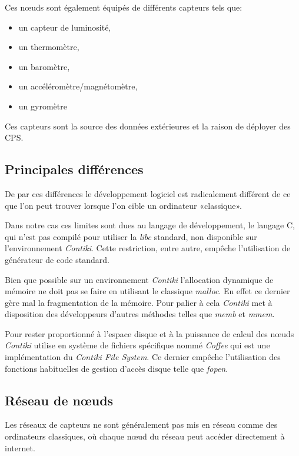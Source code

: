 Ces nœuds sont également équipés de différents capteurs tels que:
\begin{itemize}
\item un capteur de luminosité,
\item un thermomètre,
\item un baromètre,
\item un accéléromètre/magnétomètre,
\item un gyromètre
\end{itemize}

Ces capteurs sont la source des données extérieures et la raison de déployer des CPS.

\subsection{Principales différences}

De par ces différences le développement logiciel est radicalement différent de ce que l'on peut trouver lorsque l'on cible un ordinateur «classique».

Dans notre cas ces limites sont dues au langage de développement, le langage C, qui n'est pas compilé pour utiliser la \emph{libc} standard, non disponible sur l'environnement \emph{Contiki}. Cette restriction, entre autre, empêche l'utilisation de générateur de code standard.

Bien que possible sur un environnement \emph{Contiki} l'allocation dynamique de mémoire ne doit pas se faire en utilisant le classique \emph{malloc}. En effet ce dernier gère mal la fragmentation de la mémoire. Pour palier à cela \emph{Contiki} met à disposition des développeurs d'autres méthodes telles que \emph{memb} et \emph{mmem}\cite{contiki-ma}.

Pour rester proportionné à l'espace disque et à la puissance de calcul des nœuds \emph{Contiki} utilise en système de fichiers spécifique nommé \emph{Coffee} qui est une  implémentation du \emph{Contiki File System}\cite{contiki-fs}. Ce dernier empêche l'utilisation des fonctions habituelles de gestion d'accès disque telle que \emph{fopen}.

\subsection{Réseau de nœuds}

Les réseaux de capteurs ne sont généralement pas mis en réseau comme des ordinateurs classiques, où chaque nœud du réseau peut accéder directement à internet.

